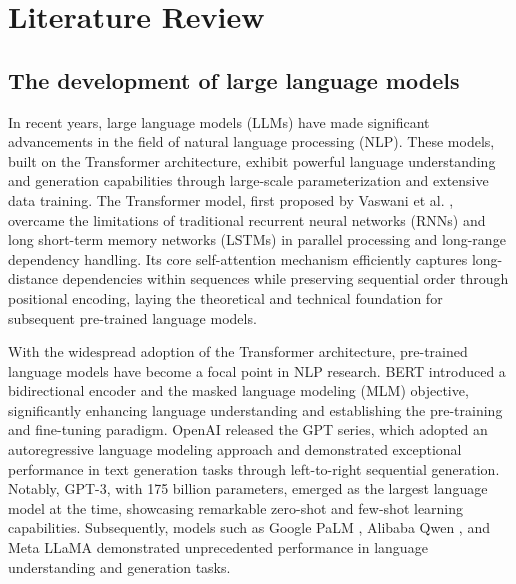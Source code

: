 \section{Literature Review}
\subsection{The development of large language models}
In recent years, large language models (LLMs) have made significant advancements in the field of natural language processing (NLP). These models, built on the Transformer architecture, exhibit powerful language understanding and generation capabilities through large-scale parameterization and extensive data training. The Transformer model, first proposed by Vaswani et al. \cite{NIPS2017_3f5ee243}, overcame the limitations of traditional recurrent neural networks (RNNs) \cite{ELMAN1990179} and long short-term memory networks (LSTMs) \cite{6795963} in parallel processing and long-range dependency handling. Its core self-attention mechanism efficiently captures long-distance dependencies within sequences while preserving sequential order through positional encoding, laying the theoretical and technical foundation for subsequent pre-trained language models.

With the widespread adoption of the Transformer architecture, pre-trained language models have become a focal point in NLP research. BERT \cite{devlin-etal-2019-bert} introduced a bidirectional encoder and the masked language modeling (MLM) objective, significantly enhancing language understanding and establishing the pre-training and fine-tuning paradigm. OpenAI released the GPT series, which adopted an autoregressive language modeling approach and demonstrated exceptional performance in text generation tasks through left-to-right sequential generation. Notably, GPT-3, with 175 billion parameters, emerged as the largest language model at the time, showcasing remarkable zero-shot and few-shot learning capabilities. Subsequently, models such as Google PaLM \cite{chowdhery2023palm}, Alibaba Qwen \cite{ZHU2025}, and Meta LLaMA \cite{LI2025110382} demonstrated unprecedented performance in language understanding and generation tasks.

